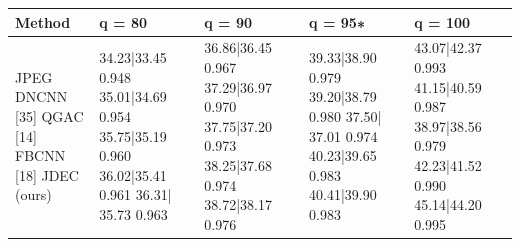 \begin{tabular}{lllll}
\toprule
Method & q = 80 & q = 90 & q = 95∗ & q = 100 \\
\midrule
JPEG DNCNN [35] QGAC [14] FBCNN [18] JDEC (ours) & 34.23|33.45 0.948 35.01|34.69 0.954 35.75|35.19 0.960 36.02|35.41 0.961 36.31| 35.73 0.963 & 36.86|36.45 0.967 37.29|36.97 0.970 37.75|37.20 0.973 38.25|37.68 0.974 38.72|38.17 0.976 & 39.33|38.90 0.979 39.20|38.79 0.980 37.50| 37.01 0.974 40.23|39.65 0.983 40.41|39.90 0.983 & 43.07|42.37 0.993 41.15|40.59 0.987 38.97|38.56 0.979 42.23|41.52 0.990 45.14|44.20 0.995 \\
\bottomrule
\end{tabular}
